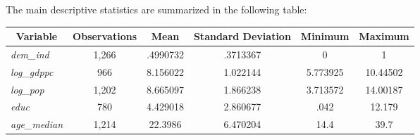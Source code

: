 \documentclass{article}
\begin{document}
\vspace{.5cm}
The main descriptive statistics are summarized in the following table:
\begin{center}
\begin{table}[hb!]
\centering

\begin{tabular}{|l|c|c|c|c|c|}
\hline
\multicolumn{1}{|c|}{\textbf{Variable}} & \textbf{Observations} & \textbf{Mean} & \textbf{Standard Deviation} & \textbf{Minimum} & \textbf{Maximum} \\ \hline
\textit{dem\_ind}                       & 1,266               & .4990732      & .3713367                    & 0                & 1                \\ \hline
\textit{log\_gdppc}                        & 966               & 8.156022      & 1.022144                      & 5.773925                & 10.44502                \\ \hline
\textit{log\_pop}                          & 1,202               & 8.665097      & 1.866238                    & 3.713572               & 14.00187               \\ \hline
\textit{educ}                          & 780               & 4.429018      & 2.860677                    & .042                & 12.179                \\ \hline
\textit{age\_median}                          & 1,214               & 22.3986      & 6.470204                    & 14.4                 &  39.7                \\ \hline
\end{tabular}
\end{table}
\end{center}

\end{document}
